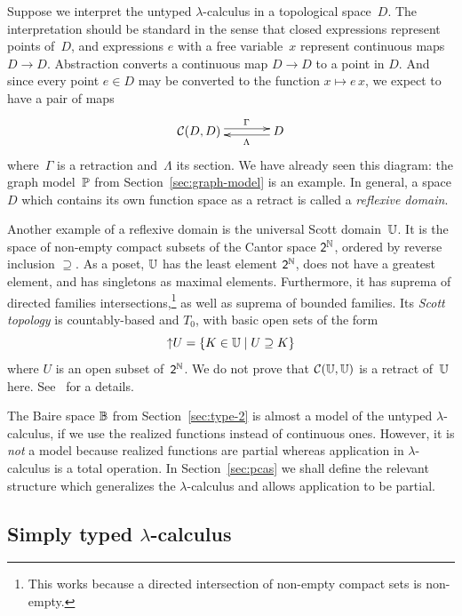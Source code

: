 Suppose we interpret the untyped $\lambda$-calculus in a topological
space~$D$. The interpretation should be standard in the sense that
closed expressions represent points of~$D$, and expressions $e$ with a
free variable~$x$ represent continuous maps $D \to D$. Abstraction
converts a continuous map $D \to D$ to a point in $D$. And since every
point $e \in D$ may be converted to the function $x \mapsto e\,x$, we
expect to have a pair of maps
%
\begin{equation*}
  \xymatrix{
    **[l]{\mathcal{C}(D, D)}
    \ar@<+0.25em>[r]^{\Gamma}
    &
    {D}
    \ar@<+0.25em>[l]^{\Lambda}
  }
\end{equation*}
%
where~$\Gamma$ is a retraction and~$\Lambda$ its section. We have
already seen this diagram: the graph model~$\mathbb{P}$ from
Section~\ref{sec:graph-model} is an example. In general, a space $D$
which contains its own function space as a retract is called a
\emph{reflexive domain}.

Another example of a reflexive domain is the universal Scott
domain~$\mathbb{U}$. It is the space of non-empty compact subsets of the
Cantor space $\mathsf{2}^{\mathbb{N}}$, ordered by reverse inclusion $\supseteq$. As
a poset, $\mathbb{U}$ has the least element $\mathsf{2}^{\mathbb{N}}$, does not have a
greatest element, and has singletons as maximal elements. Furthermore,
it has suprema of directed families intersections,\footnote{This works
  because a directed intersection of non-empty compact sets is
  non-empty.} as well as suprema of bounded families. Its \emph{Scott
  topology} is countably-based and $T_0$, with basic open sets of the
form
%
\begin{equation*}
  {\uparrow}U = \{K \in \mathbb{U} \mid U \supseteq K\}
\end{equation*}
%
where $U$ is an open subset of~$\mathsf{2}^{\mathbb{N}}$. We do not prove that
$\mathcal{C}(\mathbb{U}, \mathbb{U})$ is a retract of~$\mathbb{U}$ here.
See~\cite{ScottGunter,Stoltenberg} for a details.

The Baire space $\mathbb{B}$ from Section~\ref{sec:type-2} is almost a
model of the untyped $\lambda$-calculus, if we use the realized
functions instead of continuous ones. However, it is \emph{not} a
model because realized functions are partial whereas application in
$\lambda$-calculus is a total operation. In Section~\ref{sec:pcas} we
shall define the relevant structure which generalizes the
$\lambda$-calculus and allows application to be partial.

\subsection{Simply typed $\lambda$-calculus}
\label{sec:pcf}

